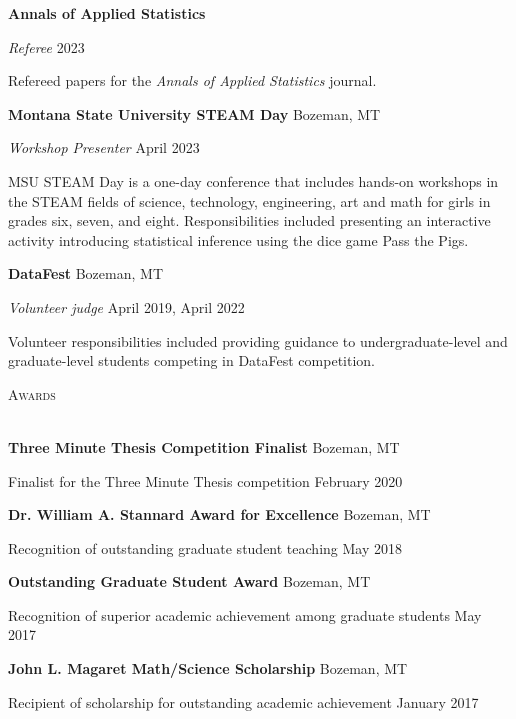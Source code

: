 \documentclass[a4paper]{article}
\newcommand{\lineunder} {
	\vspace*{-8pt} \\
	\hspace*{-18pt} \hrulefill \\
}
\newcommand{\header} [1] {
	{\hspace*{-18pt}\vspace*{6pt} \textsc{#1}}
	\vspace*{-6pt} \lineunder
}
\begin{document}
\textbf{Annals of Applied Statistics}

\emph{Referee} \hfill 2023

Refereed papers for the \emph{Annals of Applied Statistics} journal.
\vspace*{2mm}

\textbf{Montana State University STEAM Day} \hfill Bozeman, MT

\emph{Workshop Presenter} \hfill April 2023

MSU STEAM Day is a one-day conference that includes hands-on workshops
in the STEAM fields of science, technology, engineering, art and math
for girls in grades six, seven, and eight. Responsibilities included
presenting an interactive activity introducing statistical inference
using the dice game Pass the Pigs. \vspace*{2mm}

\textbf{DataFest} \hfill Bozeman, MT

\emph{Volunteer judge} \hfill April 2019, April 2022

Volunteer responsibilities included providing guidance to
undergraduate-level and graduate-level students competing in DataFest
competition. \vspace*{2mm}

\header{Awards}
\vspace*{2mm}

\textbf{Three Minute Thesis Competition Finalist} \hfill Bozeman, MT

Finalist for the Three Minute Thesis competition \hfill February 2020

\vspace*{2mm}

\textbf{Dr. William A. Stannard Award for Excellence} \hfill Bozeman, MT

Recognition of outstanding graduate student teaching \hfill May 2018

\vspace*{2mm}

\textbf{Outstanding Graduate Student Award} \hfill Bozeman, MT

Recognition of superior academic achievement among graduate students
\hfill May 2017

\vspace*{2mm}

\textbf{John L. Magaret Math/Science Scholarship} \hfill Bozeman, MT

Recipient of scholarship for outstanding academic achievement
\hfill January 2017
\end{document}
